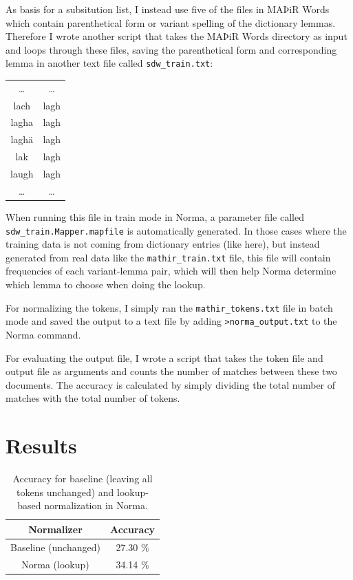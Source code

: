 \documentclass[11pt,a4paper]{article}
\begin{document}
As basis for a subsitution list, I instead use five of the files in MAÞiR Words which contain parenthetical form or variant spelling of the dictionary lemmas. Therefore I wrote another script that takes the MAÞiR Words directory as input and loops through these files, saving the parenthetical form and corresponding lemma in another text file called \texttt{sdw\_train.txt}: 

    \begin{table}[H]
    \centering
    \begin{tabular}{c|c}
        \ldots & \ldots \\
        lach & lagh \\
        lagha & lagh \\
        laghä & lagh \\
        lak & lagh \\ 
        laugh &	lagh \\ 
        \ldots & \ldots
    \end{tabular}
    \end{table}

When running this file in train mode in Norma, a parameter file called \texttt{sdw\_train.Mapper.mapfile} is automatically generated. In those cases where the training data is not coming from dictionary entries (like here), but instead generated from real data like the \texttt{mathir\_train.txt} file, this file will contain frequencies of each variant-lemma pair, which will then help Norma determine which lemma to choose when doing the lookup.

For normalizing the tokens, I simply ran the \texttt{mathir\_tokens.txt} file in batch mode and saved the output to a text file by adding \texttt{>norma\_output.txt} to the Norma command.     

For evaluating the output file, I wrote a script that takes the token file and output file as arguments and counts the number of matches between these two documents. The accuracy is calculated by simply dividing the total number of matches with the total number of tokens.

\section{Results}

    \begin{table}[H]
    \centering
    \begin{tabular}{c|c}
        \hline
        \textbf{Normalizer} & \textbf{Accuracy} \\
         \hline
        Baseline (unchanged) & 27.30 \% \\
        \hline
        Norma (lookup) & 34.14 \%  \\
        \hline
    \end{tabular}    
    \caption{\label{tab:table-results}Accuracy for baseline (leaving all tokens unchanged) and lookup-based normalization in Norma.}
    \end{table}
\end{document}

